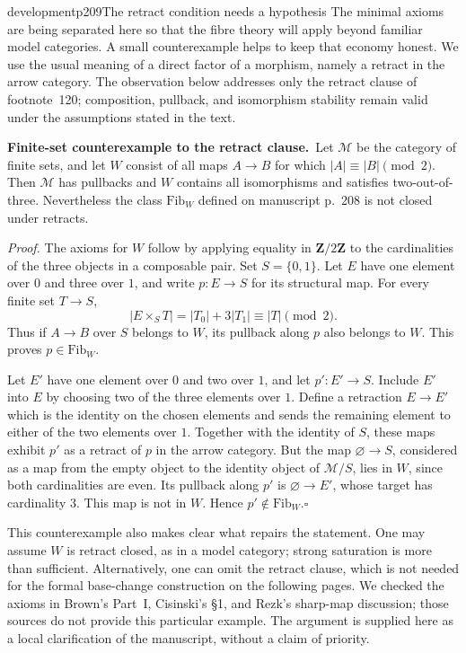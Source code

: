 \begin{dcomment}{development}{p209}{The retract condition needs a hypothesis}
The minimal axioms are being separated here so that the fibre theory will apply beyond familiar model categories. A small counterexample helps to keep that economy honest. We use the usual meaning of a direct factor of a morphism, namely a retract in the arrow category. The observation below addresses only the retract clause of footnote~120; composition, pullback, and isomorphism stability remain valid under the assumptions stated in the text.

\noindent\textbf{Finite-set counterexample to the retract clause.}\ours\ 
Let $\mathcal M$ be the category of finite sets, and let $W$ consist of all maps $A\to B$ for which $|A|\equiv|B|\pmod2$. Then $\mathcal M$ has pullbacks and $W$ contains all isomorphisms and satisfies two-out-of-three. Nevertheless the class $\mathrm{Fib}_W$ defined on manuscript p.~208 is not closed under retracts.

\emph{Proof.} The axioms for $W$ follow by applying equality in $\mathbf Z/2\mathbf Z$ to the cardinalities of the three objects in a composable pair. Set $S=\{0,1\}$. Let $E$ have one element over $0$ and three over $1$, and write $p:E\to S$ for its structural map. For every finite set $T\to S$,
\[
 |E\times_S T|=|T_0|+3|T_1|\equiv|T|\pmod2.
\]
Thus if $A\to B$ over $S$ belongs to $W$, its pullback along $p$ also belongs to $W$. This proves $p\in\mathrm{Fib}_W$.

Let $E'$ have one element over $0$ and two over $1$, and let $p':E'\to S$. Include $E'$ into $E$ by choosing two of the three elements over $1$. Define a retraction $E\to E'$ which is the identity on the chosen elements and sends the remaining element to either of the two elements over $1$. Together with the identity of $S$, these maps exhibit $p'$ as a retract of $p$ in the arrow category. But the map $\varnothing\to S$, considered as a map from the empty object to the identity object of $\mathcal M/S$, lies in $W$, since both cardinalities are even. Its pullback along $p'$ is $\varnothing\to E'$, whose target has cardinality $3$. This map is not in $W$. Hence $p'\notin\mathrm{Fib}_W$.\hfill$\square$

This counterexample also makes clear what repairs the statement. One may assume $W$ is retract closed, as in a model category; strong saturation is more than sufficient. Alternatively, one can omit the retract clause, which is not needed for the formal base-change construction on the following pages. We checked the axioms in Brown's Part~I, Cisinski's \S1, and Rezk's sharp-map discussion; those sources do not provide this particular example. The argument is supplied here as a local clarification of the manuscript, without a claim of priority.
\end{dcomment}

